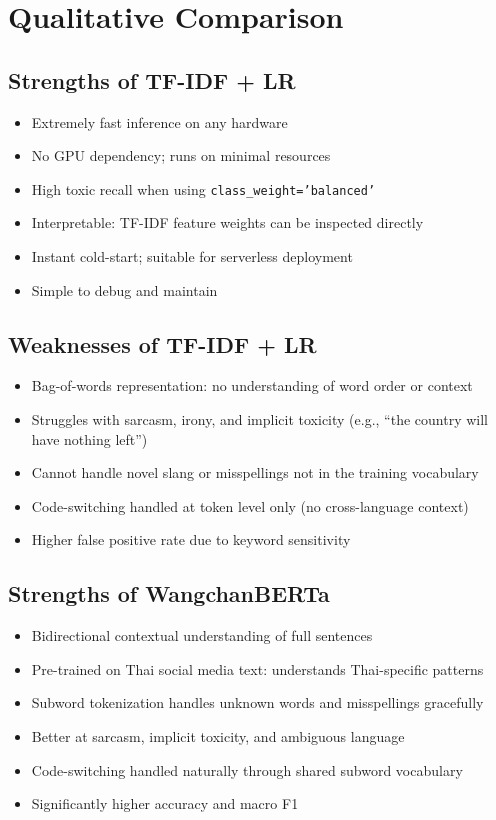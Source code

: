 \documentclass[11pt,a4paper]{article}
\begin{document}
\section{Qualitative Comparison}

\subsection{Strengths of TF-IDF + LR}
\begin{itemize}[nosep]
    \item Extremely fast inference on any hardware
    \item No GPU dependency; runs on minimal resources
    \item High toxic recall when using \texttt{class\_weight='balanced'}
    \item Interpretable: TF-IDF feature weights can be inspected directly
    \item Instant cold-start; suitable for serverless deployment
    \item Simple to debug and maintain
\end{itemize}

\subsection{Weaknesses of TF-IDF + LR}
\begin{itemize}[nosep]
    \item Bag-of-words representation: no understanding of word order or context
    \item Struggles with sarcasm, irony, and implicit toxicity (e.g., ``the country will have nothing left'')
    \item Cannot handle novel slang or misspellings not in the training vocabulary
    \item Code-switching handled at token level only (no cross-language context)
    \item Higher false positive rate due to keyword sensitivity
\end{itemize}

\subsection{Strengths of WangchanBERTa}
\begin{itemize}[nosep]
    \item Bidirectional contextual understanding of full sentences
    \item Pre-trained on Thai social media text: understands Thai-specific patterns
    \item Subword tokenization handles unknown words and misspellings gracefully
    \item Better at sarcasm, implicit toxicity, and ambiguous language
    \item Code-switching handled naturally through shared subword vocabulary
    \item Significantly higher accuracy and macro F1
\end{itemize}
\end{document}
